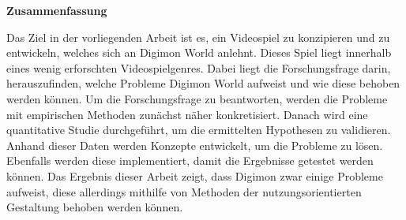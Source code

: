 \newpage

\thispagestyle{empty} %

\vspace*{1cm}
\begin{center}
    {\Huge \bf Zusammenfassung}
\end{center}
\vspace*{1.4cm}

Das Ziel in der vorliegenden Arbeit ist es, ein Videospiel zu konzipieren und zu entwickeln, welches sich an Digimon World anlehnt.
Dieses Spiel liegt innerhalb eines wenig erforschten Videospielgenres.
Dabei liegt die Forschungsfrage darin, herauszufinden, welche Probleme Digimon World aufweist und wie diese behoben werden können.
Um die Forschungsfrage zu beantworten, werden die Probleme mit empirischen Methoden zunächst näher konkretisiert.
Danach wird eine quantitative Studie durchgeführt, um die ermittelten Hypothesen zu validieren.
Anhand dieser Daten werden Konzepte entwickelt, um die Probleme zu lösen.
Ebenfalls werden diese implementiert, damit die Ergebnisse getestet werden können.
Das Ergebnis dieser Arbeit zeigt, dass Digimon zwar einige Probleme aufweist, diese allerdings mithilfe von Methoden der nutzungsorientierten Gestaltung behoben werden können.
